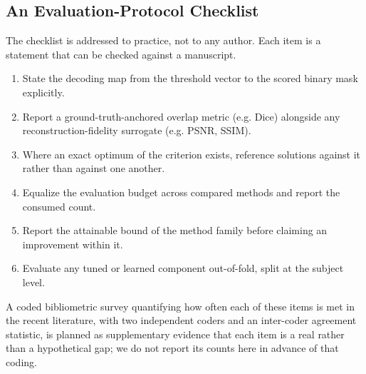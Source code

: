 \subsection{An Evaluation-Protocol Checklist}

The checklist is addressed to practice, not to any author. Each item is a
statement that can be checked against a manuscript.
\begin{enumerate}
  \item State the decoding map from the threshold vector to the scored binary
  mask explicitly.
  \item Report a ground-truth-anchored overlap metric (e.g. Dice) alongside any
  reconstruction-fidelity surrogate (e.g. PSNR, SSIM).
  \item Where an exact optimum of the criterion exists, reference solutions
  against it rather than against one another.
  \item Equalize the evaluation budget across compared methods and report the
  consumed count.
  \item Report the attainable bound of the method family before claiming an
  improvement within it.
  \item Evaluate any tuned or learned component out-of-fold, split at the subject
  level.
\end{enumerate}

A coded bibliometric survey quantifying how often each of these items is met in
the recent literature, with two independent coders and an inter-coder
agreement statistic, is planned as supplementary evidence that each item is a
real rather than a hypothetical gap; we do not report its counts here in advance
of that coding.
